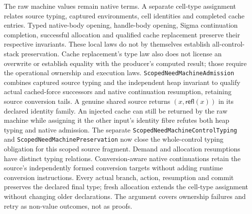 \documentclass[11pt]{article}
\theoremstyle{definition}
\theoremstyle{remark}
\begin{document}
The raw machine values remain native terms. A separate cell-type assignment
relates source typing, captured environments, cell identities and completed
cache entries. Typed native-body opening, handle-body opening, Sigma
continuation completion, successful allocation and qualified cache replacement
preserve their respective invariants. These local laws do not by themselves
establish all-control-stack preservation. Cache replacement's type law also
does not license an overwrite or establish equality with the producer's
computed result; those require the operational ownership and execution laws.
\nolinkurl{ScopedNeedMachineAdmission} combines captured source typing and
the independent heap invariant to qualify actual cached-force successors and
native continuation resumption, retaining source conversion tails. A genuine
shared source returns $(x,\mathsf{refl}(x))$ in its declared identity family.
An injected cache can still be returned by the raw machine while assigning it
the other input's identity fibre refutes both heap typing and native admission.
The separate \nolinkurl{ScopedNeedMachineControlTyping} and
\nolinkurl{ScopedNeedMachinePreservation} now close the whole-control typing
obligation for this scoped source fragment. Demand and allocation resumptions
have distinct typing relations. Conversion-aware native continuations retain
the source's independently formed conversion targets without adding runtime
conversion instructions. Every actual branch, action, resumption and commit
preserves the declared final type; fresh allocation extends the cell-type
assignment without changing older declarations. The argument covers ownership
failures and retry as non-value outcomes, not as proofs.
\end{document}
